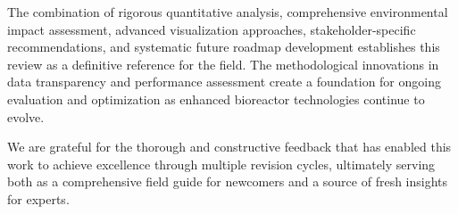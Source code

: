 \documentclass[12pt,a4paper]{article}
\begin{document}
The combination of rigorous quantitative analysis, comprehensive environmental impact assessment, advanced visualization approaches, stakeholder-specific recommendations, and systematic future roadmap development establishes this review as a definitive reference for the field. The methodological innovations in data transparency and performance assessment create a foundation for ongoing evaluation and optimization as enhanced bioreactor technologies continue to evolve.

We are grateful for the thorough and constructive feedback that has enabled this work to achieve excellence through multiple revision cycles, ultimately serving both as a comprehensive field guide for newcomers and a source of fresh insights for experts.
\end{document}
